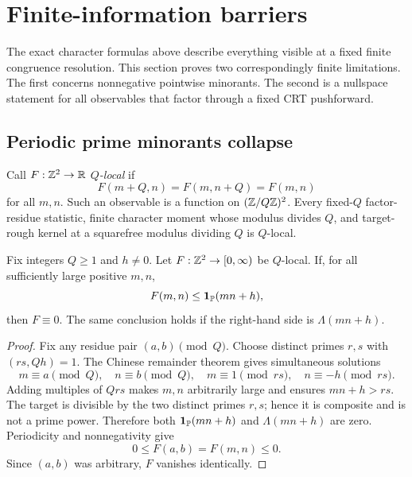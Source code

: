 \section{Finite-information barriers}\label{sec:finite-barriers}

The exact character formulas above describe everything visible at a fixed
finite congruence resolution.  This section proves two correspondingly
finite limitations.  The first concerns nonnegative pointwise minorants.  The
second is a nullspace statement for all observables that factor through a
fixed CRT pushforward.

\subsection{Periodic prime minorants collapse}

Call $F:\mathbb Z^2\to\mathbb R$ \emph{$Q$-local} if
\begin{equation}\label{eq:q-local-observable}
 F(m+Q,n)=F(m,n+Q)=F(m,n)
\end{equation}
for all $m,n$.  Such an observable is a function on
$(\mathbb Z/Q\mathbb Z)^2$.  Every fixed-$Q$ factor-residue statistic, finite character
moment whose modulus divides $Q$, and target-rough kernel at a squarefree
modulus dividing $Q$ is $Q$-local.

\begin{theorem}\label{thm:periodic-minorant-collapse}
Fix integers $Q\ge1$ and $h\ne0$.  Let $F:\mathbb Z^2\to[0,\infty)$ be $Q$-local.
If, for all sufficiently large positive $m,n$,
\begin{equation}\label{eq:prime-minorant-condition}
 F(m,n)\le\mathbf 1_{\mathbb P}(mn+h),
\end{equation}
then $F\equiv0$.  The same conclusion holds if the right-hand side is
$\Lambda(mn+h)$.
\end{theorem}

\begin{proof}
Fix any residue pair $(a,b)\pmod Q$.  Choose distinct primes $r,s$ with
$(rs,Qh)=1$.  The Chinese remainder
theorem gives simultaneous solutions
\[
 m\equiv a\pmod Q,
 \quad n\equiv b\pmod Q,
 \quad m\equiv1\pmod{rs},
 \quad n\equiv-h\pmod{rs}.
\]
Adding multiples of $Qrs$ makes $m,n$ arbitrarily large and ensures
$mn+h>rs$.  The target is divisible by the two distinct primes $r,s$;
hence it is composite and is not a prime power.  Therefore both
$\mathbf 1_{\mathbb P}(mn+h)$ and $\Lambda(mn+h)$ are zero.  Periodicity and
nonnegativity give
\[
 0\le F(a,b)=F(m,n)\le0.
\]
Since $(a,b)$ was arbitrary, $F$ vanishes identically.
\end{proof}

